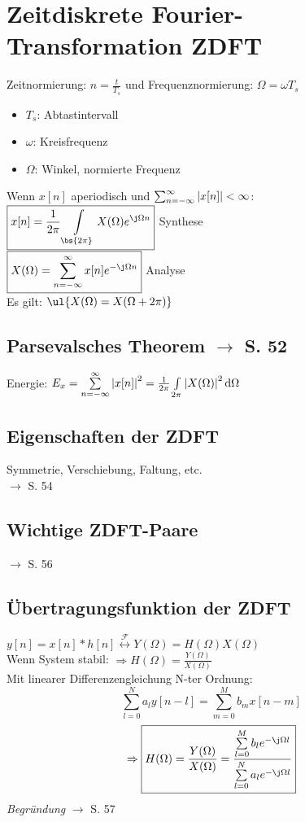 \documentclass[german]{latex4ei/latex4ei_sheet}
\renewcommand{\diff}{\mathop{}\!\mathrm{\vphantom( d}}
\begin{document}
\section{Zeitdiskrete Fourier-Transformation ZDFT}
\begin{sectionbox}
Zeitnormierung: $n = \frac{t}{T_s}$ und Frequenznormierung: $\Omega = \omega T_s$
\begin{itemize}
	\item $T_s$: Abtastintervall
	\item $\omega$: Kreisfrequenz
	\item $\Omega$: Winkel, normierte Frequenz
\end{itemize}
Wenn $x[n]$ aperiodisch und $\sum_{n = -\infty}^{\infty}{\abs{x[n]}} < \infty$:\\
$\boxed{x[n] = \frac{1}{2 \pi}\int\limits_{\bs{2 \pi}}{X(\Omega) e^{\j \Omega n}}}$ \hfill Synthese\\
$\boxed{X(\Omega) = \sum\limits_{n = -\infty}^{\infty}{x[n] e^{-\j \Omega n}}}$ \hfill Analyse\\
Es gilt: $\ul{X(\Omega) = X(\Omega + 2 \pi)}$

	\subsection*{Parsevalsches Theorem $\rightarrow$ S. 52}
	Energie: $E_x = \sum\limits_{n = -\infty}^{\infty}{\abs{x[n]}^2} = \frac{1}{2 \pi}\int\limits_{2 \pi}{\abs{X(\Omega)}^2 \diff \Omega}$
	
	\subsection*{Eigenschaften der ZDFT}
	Symmetrie, Verschiebung, Faltung, etc.\\
	$\rightarrow$ S. 54
	
	\subsection*{Wichtige ZDFT-Paare}
	$\rightarrow$ S. 56
	
	\subsection*{Übertragungsfunktion der ZDFT}
	$y[n] = x[n] \ast h[n] \stackrel{\mathcal{F}}{\longleftrightarrow} Y(\Omega) = H(\Omega) X(\Omega)$\\
	Wenn System stabil: $\Rightarrow \boxed{H(\Omega) = \frac{Y(\Omega)}{X(\Omega)}}$\\
	Mit linearer Differenzengleichung N-ter Ordnung:
	\[\sum\limits_{l=0}^{N}{a_l y[n - l]} = \sum\limits_{m = 0}^{M}{b_m x[n - m]}\]
	\[\Rightarrow \boxed{H(\Omega) = \frac{Y(\Omega)}{X(\Omega)} = \frac{\sum\limits_{l=0}^{M}{b_l e^{-\j\Omega l}}}{\sum\limits_{l=0}^{N}{a_l e^{-\j\Omega l}}}}\]
	\emph{Begründung} $\rightarrow$ S. 57
	
	\end{sectionbox}
\end{document}
